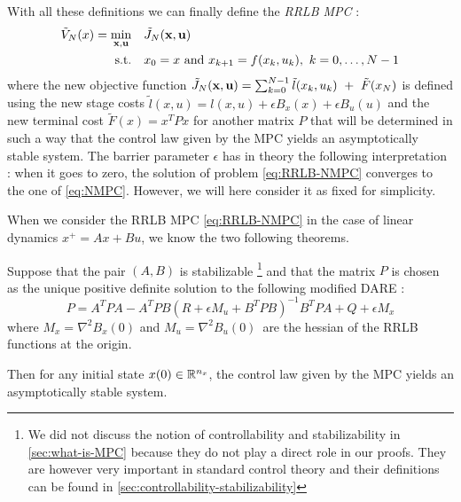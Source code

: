 \documentclass[12pt]{article}
\begin{document}
\vspace{24pt}

\noindent With all these definitions we can finally define the \textit{RRLB MPC} :
\begin{align}
	\begin{split}\label{eq:RRLB-NMPC}
		\tilde{V}_N(x)=\underset{\bf{x},\bf{u}}{\min} &\quad \tilde{J}_N(\bf{x},\bf{u})\\
		\text{s.t.} &\quad x_0=x\text{ and }x_{k+1}=f(x_k,u_k),~k=0,\dots,N-1\\
	\end{split}
\end{align}
where the new objective function $\tilde{J}_N(\bf{x},\bf{u})=\sum_{k=0}^{N-1}\tilde{l}(x_k,u_k)~+~\tilde{F}(x_N)$ is defined using the new stage costs $\tilde{l}(x,u)=l(x,u)+\epsilon B_x(x)+\epsilon B_u(u)$ and the new terminal cost $\tilde{F}(x)=x^TPx$ for another matrix $P$ that will be determined in such a way that the control law given by the MPC yields an asymptotically stable system.
The barrier parameter $\epsilon$ has in theory the following interpretation : when it goes to zero, the solution of problem \ref{eq:RRLB-NMPC} converges to the one of \ref{eq:NMPC}.
However, we will here consider it as fixed for simplicity.

\vspace{12pt}

\noindent When we consider the RRLB MPC \ref{eq:RRLB-NMPC} in the case of linear dynamics $x^+=Ax+Bu$, we know the two following theorems.

\begin{theorem}
	\label{nominal-stability-linear-case}
	Suppose that the pair $(A,B)$ is stabilizable \footnote{We did not discuss the notion of controllability and stabilizability in \ref{sec:what-is-MPC} because they do not play a direct role in our proofs. They are however very important in standard control theory and their definitions can be found in \ref{sec:controllability-stabilizability}}
	and that the matrix $P$ is chosen as the unique positive definite solution to the following modified DARE :
	$$P=A^TPA-A^TPB(R+\epsilon M_u+B^TPB)^{-1}B^TPA+Q+\epsilon M_x$$
	where $M_x=\nabla^2 B_x(0)$ and $M_u=\nabla^2 B_u(0)$\, are the hessian of the RRLB functions at the origin.

	Then for any initial state $x(0)\in\R^{n_x}$, the control law given by the MPC yields an asymptotically stable system.
\end{theorem}
\end{document}
